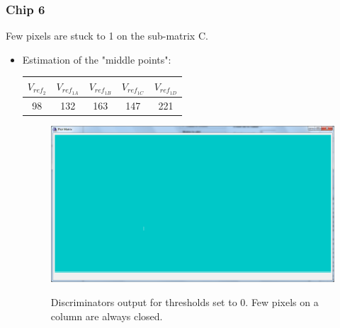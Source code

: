 \documentclass[a4papper, 10pt]{article}
\begin{document}
    \subsubsection{Chip 6}
  
    Few pixels are stuck to 1 on the sub-matrix C.
  
    \begin{itemize}
  
    \item Estimation of the "middle points":
    \begin{center}
    \begin{tabular}{ c c c c c }
      \hline %
      \rowcolor{light-gray} $V_{ref_2}$  &   $V_{ref_{1A}}$  &   $V_{ref_{1B}}$  &   $V_{ref_{1C}}$  &   $V_{ref_{1D}}$  \tabularnewline
      \hline %
      \hline %
      98        &        132        &         163       &       147         &        221        \tabularnewline
      \hline %
    \end{tabular}
    \end{center}

    \begin{figure}[!h]
      \begin{center}
        \includegraphics[width = 12cm]{Pictures/Chip6/discri_0.png}
        \label{fig:discri0_chip6}
        \caption{Discriminators output for thresholds set to 0. Few pixels on a column are always closed.}
      \end{center}
    \end{figure}
  

\end{itemize}
\end{document}
